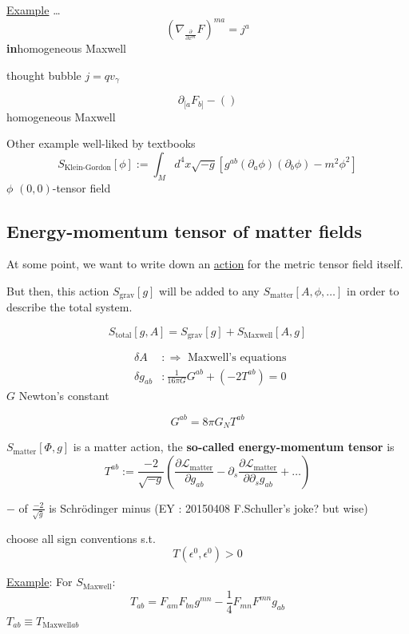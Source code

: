 	\underline{Example} \dots 
	\[
	(\nabla_{\frac{ \partial }{ \partial x^m} }F)^{ma} = j^a
	\]
	\textbf{in}homogeneous Maxwell
	
	thought bubble $j=qv_{\gamma}$
	
	\[
	\partial_{[a}F_{b]} - ()
	\]
	homogeneous Maxwell
	
	Other example well-liked by textbooks
	\[
	S_{\text{Klein-Gordon}}[\phi] := \int_M d^4x \sqrt{-g}[g^{ab}(\partial_a \phi) (\partial_b \phi ) - m^2\phi^2]
	\]
	$\phi$ $(0,0)$-tensor field
	
	\subsection{Energy-momentum tensor of matter fields}
	
	At some point, we want to write down an \underline{action} for the metric tensor field itself.
	
	But then, this action $S_{\text{grav}}[g]$ will be added to any $S_{\text{matter}}[A,\phi,\dots]$ in order to describe the total system.  
	
	\[
	S_{\text{total}}[g,A] = S_{\text{grav}}[g] + S_{\text{Maxwell}}[A,g]
	\]
	
	\[
	\begin{aligned}
	& \delta A     & : \Longrightarrow \text{ Maxwell's equations } \\
	& \delta g_{ab} & : \boxed{ \frac{1}{ 16 \pi G } G^{ab} } + (-2T^{ab} ) = 0 
	\end{aligned}
	\]
	$G$ Newton's constant
	
	\[
	G^{ab} = 8 \pi G_N T^{ab}
	\]
	
	\begin{definition}
		$  S_{\text{matter}}[\Phi,g] $ is a matter action, the \textbf{so-called energy-momentum tensor} is 
		\[
		T^{ab} := \frac{-2}{ \sqrt{-g}} \left( \frac{ \partial \mathcal{L}_{\text{matter}} }{ \partial g_{ab}} - \partial_s \frac{ \partial \mathcal{L}_{\text{matter}} }{ \partial \partial_s g_{ab}} + \dots \right)
		\]
	\end{definition}
	$-$ of $\frac{-2}{\sqrt{g}}$ is Schr\"{o}dinger minus (EY : 20150408 F.Schuller's joke? but wise)
	
	choose all sign conventions s.t.
	\[
	T(\epsilon^0,\epsilon^0) >0
	\]
	
	\underline{Example}: For $S_{\text{Maxwell}}$:
	\[
	T_{ab} = F_{am} F_{bn}g^{mn} - \frac{1}{4} F_{mn} F^{mn} g_{ab}
	\]
	$T_{ab} \equiv T_{\text{Maxwell}ab}$
	
